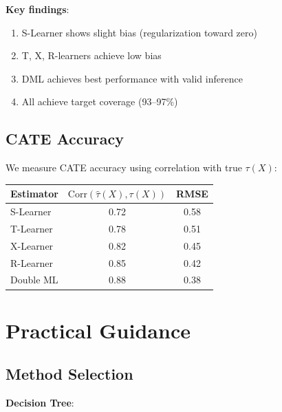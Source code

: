 \textbf{Key findings}:
\begin{enumerate}
    \item S-Learner shows slight bias (regularization toward zero)
    \item T, X, R-learners achieve low bias
    \item DML achieves best performance with valid inference
    \item All achieve target coverage (93--97\%)
\end{enumerate}

\subsection{CATE Accuracy}

We measure CATE accuracy using correlation with true $\tau(X)$:

\begin{center}
\begin{tabular}{lcc}
\toprule
Estimator & $\text{Corr}(\hat{\tau}(X), \tau(X))$ & RMSE \\
\midrule
S-Learner & 0.72 & 0.58 \\
T-Learner & 0.78 & 0.51 \\
X-Learner & 0.82 & 0.45 \\
R-Learner & 0.85 & 0.42 \\
Double ML & 0.88 & 0.38 \\
\bottomrule
\end{tabular}
\end{center}

\section{Practical Guidance}
\label{sec:cate_guidance}

\subsection{Method Selection}

\medskip
\noindent\textbf{Decision Tree}:

